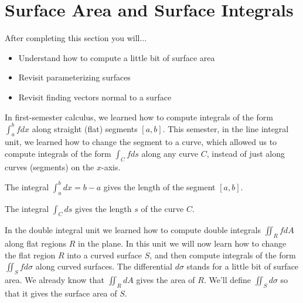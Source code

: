 \documentclass[10pt,]{book}
\theoremstyle{plain}
\theoremstyle{definition}
\theoremstyle{definition}
\theoremstyle{definition}
\theoremstyle{definition}
\theoremstyle{definition}
\numberwithin{equation}{section}
\begin{document}
\section[{Surface Area and Surface Integrals}]{Surface Area and Surface Integrals}\label{section-43}
After completing this section you will... \leavevmode%
\begin{itemize}[label=\textbullet]
\item{}Understand how to compute a little bit of surface area%
\item{}Revisit parameterizing surfaces%
\item{}Revisit finding vectors normal to a surface%
\end{itemize}
%
\par
In first-semester calculus, we learned how to compute integrals of the form \(\int_a^b f dx\) along straight (flat) segments \([a,b]\). This semester, in the line integral unit, we learned how to change the segment to a curve, which allowed us to compute integrals of the form \(\int_C fds\) along any curve \(C\), instead of just along curves (segments) on the \(x\)-axis.%
\par
The integral \(\int_a^b dx=b-a\) gives the length of the segment \([a,b]\).%
\par
The integral \(\int_C ds\) gives the length \(s\) of the curve \(C\).%
\par
In the double integral unit we learned how to compute double integrals \(\iint_R fdA\) along flat regions \(R\) in the plane. In this unit we will now learn how to change the flat region \(R\) into a curved surface \(S\), and then compute integrals of the form \(\iint_S fd\sigma\) along curved surfaces. The differential \(d\sigma\) stands for a little bit of surface area. We already know that \(\iint_R dA\) gives the area of \(R\). We'll define \(\iint_S d\sigma\) so that it gives the surface area of \(S\).%
\end{document}
